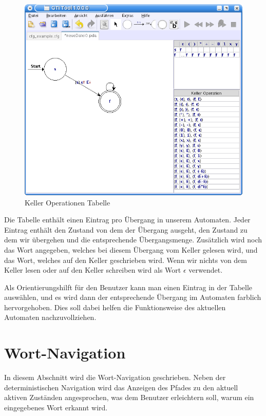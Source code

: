\begin{figure}[h!]
\begin{center}
\includegraphics[width=12cm]{../images/stack_operation_table.png}
\caption{Keller Operationen Tabelle}
\end{center}
\end{figure}
\vspace{10pt}

Die Tabelle enthält einen Eintrag pro Übergang in unserem Automaten. Jeder
Eintrag enthält den Zustand von dem der Übergang ausgeht, den Zustand zu dem
wir übergehen und die entsprechende Übergangsmenge. Zusätzlich wird noch
das Wort angegeben, welches bei diesem Übergang vom Keller gelesen wird, und
das Wort, welches auf den Keller geschrieben wird. Wenn wir nichts von dem
Keller lesen oder auf den Keller schreiben wird als Wort $\epsilon$
verwendet.\vspace{10pt} 

Als Orientierungshilft für den Benutzer kann man einen Eintrag in der Tabelle
auswählen, und es wird dann der entsprechende Übergang im Automaten farblich
hervorgehoben. Dies soll dabei helfen die Funktionsweise des aktuellen
Automaten nachzuvollziehen.\vspace{10pt}


\section{Wort-Navigation}\label{wordNavigation}

In diesem Abschnitt wird die Wort-Navigation geschrieben. Neben der
deterministischen Navigation wird das Anzeigen des Pfades zu den aktuell
aktiven Zuständen angesprochen, was dem Benutzer erleichtern soll, warum ein
eingegebenes Wort erkannt wird.


